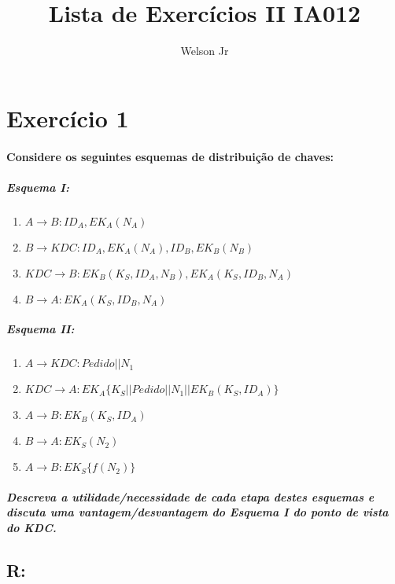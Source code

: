 \documentclass[10pt,a4paper]{report}
\author{Welson Jr}
\title{Lista de Exercícios II IA012}
\begin{document}
\maketitle
\section*{Exercício 1} 
\paragraph{ Considere os seguintes esquemas de distribuição de chaves:}
\subparagraph{ Esquema I:}
\begin{enumerate}[(1)]
\item $A \rightarrow B: ID_A, EK_A(N_A)$
\item $B \rightarrow KDC: ID_A, EK_A(N_A), ID_B, EK_B(N_B)$
\item $KDC \rightarrow B: EK_B(K_S, ID_A, N_B), EK_A(K_S, ID_B, N_A)$
\item $B \rightarrow A: EK_A(K_S, ID_B, N_A)$
\end{enumerate}
\subparagraph{ Esquema II:}
\begin{enumerate}[(1)]
\item $A \rightarrow KDC: Pedido || N_1$
\item $KDC \rightarrow A: EK_A\{K_S || Pedido || N_1 || EK_B(K_S, ID_A)\}$
\item $A \rightarrow B: EK_B(K_S, ID_A)$
\item $B \rightarrow A: EK_S(N_2)$
\item $A \rightarrow B: EK_S\{ f(N_2) \}$
\end{enumerate}
\subparagraph{
Descreva a utilidade/necessidade de cada etapa destes esquemas e discuta uma vantagem/desvantagem do Esquema I do ponto de vista do KDC.}
\subsection*{R:}
\end{document}
